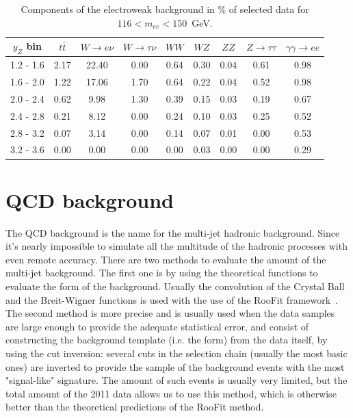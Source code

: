 \begin{table}
\centering
\begin{tabular}{ c cccccccc } \hline \hline
 $y_Z$ bin & $t\bar t$ & $W \to e\nu$ & $W \to \tau\nu$ &  $WW$ & $WZ$ & $ZZ$ & $Z \to \tau\tau$  & $\gamma\gamma \to ee$\\  \hline
 1.2 -  1.6 &   2.17 &  22.40 &   0.00 &   0.64 &   0.30 &   0.04 &   0.61 &   0.98 \\
 1.6 -  2.0 &   1.22 &  17.06 &   1.70 &   0.64 &   0.22 &   0.04 &   0.52 &   0.98 \\
 2.0 -  2.4 &   0.62 &   9.98 &   1.30 &   0.39 &   0.15 &   0.03 &   0.19 &   0.67 \\
 2.4 -  2.8 &   0.21 &   8.12 &   0.00 &   0.24 &   0.10 &   0.03 &   0.25 &   0.52 \\
 2.8 -  3.2 &   0.07 &   3.14 &   0.00 &   0.14 &   0.07 &   0.01 &   0.00 &   0.53 \\
 3.2 -  3.6 &   0.00 &   0.00 &   0.00 &   0.00 &   0.03 &   0.00 &   0.00 &   0.29 \\
\hline \hline
\end{tabular}
\caption{Components of the electroweak background in \% of selected data for $116 < m_{ee} < 150$~GeV.}
\label{tab:bkg_ew_high}
\end{table}

\section{QCD background}

The QCD background is the name for the multi-jet hadronic background. Since it's nearly impossible to simulate all the multitude of the hadronic processes with even remote accuracy. There are two methods to evaluate the amount of the multi-jet background. The first one is by using the theoretical functions to evaluate the form of the background. Usually the convolution of the Crystal Ball and the Breit-Wigner functions is used with the use of the RooFit framework~\cite{lib:bkg_roofit}. The second method is more precise and is usually used when the data samples are large enough to provide the adequate statistical error, and consist of constructing the background template (i.e. the form) from the data itself, by using the cut inversion: several cuts in the selection chain (usually the most basic ones) are inverted to provide the sample of the background events with the most "signal-like" signature. The amount of such events is usually very limited, but the total amount of the 2011 data allows us to use this method, which is otherwise better than the theoretical predictions of the RooFit method.


